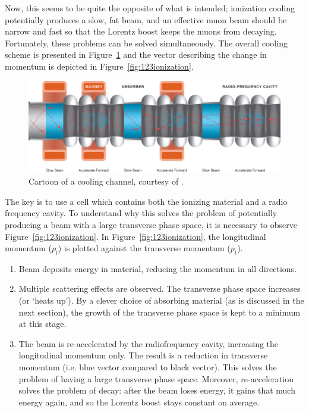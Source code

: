 Now, this seems to be quite the opposite of what is intended; ionization cooling potentially produces a slow, fat beam, and an effective muon beam should be narrow and fast so that the Lorentz boost keeps the muons from decaying. Fortunately, these problems can be solved simultaneously. The overall cooling scheme is presented in  Figure~\ref{fig:coolingchannel} and the vector describing the change in momentum is depicted in Figure~\ref{fig:123ionization}.
\begin{figure}
  \begin{center} 
    \includegraphics[width=\textwidth]{Figures/coolingchannel} 
  \caption{Cartoon of a cooling channel, courtesy of \cite{map}.}
  \label{fig:coolingchannel}
 \end{center}
\end{figure}

The key is to use a cell which contains both the ionizing material and a radio frequency cavity. To understand why this solves the problem of potentially producing a beam with a large transverse phase space, it is necessary to observe Figure~\ref{fig:123ionization}. In Figure~\ref{fig:123ionization}, the longitudinal momentum ($p_l$) is plotted against the transverse momentum ($p_t$). 
   \begin{enumerate} 
  \item{Beam deposits energy in material, reducing the momentum in all directions.}
  \item{Multiple scattering effects are observed. The transverse phase space increases (or `heats up'). By a clever choice of absorbing material (as is discussed in the next section), the growth of the transverse phase space is kept to a minimum at this stage.}
  \item{The beam is re-accelerated by the radiofrequency cavity, increasing the longitudinal momentum only. The result is a reduction in transverse momentum (i.e. blue vector compared to black vector). This solves the problem of having a large transverse phase space. Moreover, re-acceleration solves the problem of decay: after the beam loses energy, it gains that much energy again, and so the Lorentz boost stays constant on average.}
\end{enumerate}

